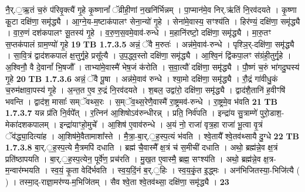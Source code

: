 \documentclass[17pt]{extarticle}
\begin{document}
                  नै॒र्.॒ऋ॒तं च॒रुं प॑रिवृ॒क्त्यै॑ गृ॒हे कृ॒ष्णानां᳚ ॅव्रीही॒णां न॒खनि॑र्भिन्नम् । पा॒प्मान॑मे॒व निर्.ऋ॑तिं नि॒रव॑दयते । कृ॒ष्णा कू॒टा दक्षि॑णा॒ समृ॑द्ध्यै । आ॒ग्ने॒य-म॒ष्टाक॑पालꣳ सेना॒न्यो॑ गृ॒हे । सेना॑मे॒वास्य॒ सꣳश्य॑ति । हिर॑ण्यं॒ दक्षि॑णा॒ समृ॑द्ध्यै । वा॒रु॒णं दश॑कपालꣳ सू॒तस्य॑ गृ॒हे । व॒रु॒ण॒स॒वमे॒वाव॑-रुन्धे । म॒हानि॑रष्टो॒ दक्षि॑णा॒ समृ॑द्ध्यै । मा॒रु॒तꣳ स॒प्तक॑पालं ग्राम॒ण्यो॑ गृ॒हे \textbf{ 19} \newline
                  \newline
                                \textbf{ TB 1.7.3.5} \newline
                  अन्नं॒ ॅवै म॒रुतः॑ । अन्न॑मे॒वाव॑-रुन्धे । पृश्ञि॒र्-दक्षि॑णा॒ समृ॑द्ध्यै । सा॒वि॒त्रं द्वाद॑शकपालं क्ष॒त्तुर्गृ॒हे प्रसू᳚त्यै । उ॒प॒द्ध्व॒स्तो दक्षि॑णा॒ समृ॑द्ध्यै । आ॒श्वि॒नं द्वि॑कपा॒लꣳ स॑ग्रंही॒तुर्गृ॒हे । अ॒श्विनौ॒ वै दे॒वानां᳚ भि॒षजौ᳚ । ताभ्या॑मे॒वास्मै॑ भेष॒जं क॑रोति । स॒वा॒त्यौ॑ दक्षि॑णा॒ समृ॑द्ध्यै । पौ॒ष्णं च॒रुं भा॑गदु॒घस्य॑ गृ॒हे \textbf{ 20} \newline
                  \newline
                                \textbf{ TB 1.7.3.6} \newline
                  अन्नं॒ ॅवै पू॒षा । अन्न॑मे॒वाव॑ रुन्धे । श्या॒मो दक्षि॑णा॒ समृ॑द्ध्यै । रौ॒द्रं गा॑वीधु॒कं च॒रुम॑क्षावा॒पस्य॑ गृ॒हे । अ॒न्त॒त ए॒व रु॒द्रं नि॒रव॑दयते । श॒बल॒ उद्वा॑रो॒ दक्षि॑णा॒ समृ॑द्ध्यै । द्वाद॑शै॒तानि॑ ह॒वीꣳषि॑ भवन्ति । द्वाद॑श॒ मासाः᳚ सम्ॅवथ्स॒रः । स॒म्ॅव॒थ्स॒रेणै॒वास्मै॑ रा॒ष्ट्रमव॑-रुन्धे । रा॒ष्ट्रमे॒व भ॑वति \textbf{ 21} \newline
                  \newline
                                \textbf{ TB 1.7.3.7} \newline
                  यन्न प्र॑ति नि॒र्वपे᳚त् । र॒त्निन॑ आ॒शिषोऽव॑रुन्धीरन्न् । प्रति॒ निर्व॑पति । इन्द्रा॑य सु॒त्राम्णे॑ पुरो॒डाश॒-मेका॑दशकपालम् । इन्द्रा॑याꣳहो॒मुचे᳚ । आ॒शिष॑ ए॒वाव॑रुन्धे । अ॒यं नो॒ राजा॑ वृत्र॒हा राजा॑ भू॒त्वा वृ॒त्रं ॅव॑द्ध्या॒दित्या॑ह । आ॒शिष॑मे॒वैतामाशा᳚स्ते । मै॒त्रा॒-बा॒र्.॒ह॒स्प॒त्यं भ॑वति । श्वे॒तायै᳚ श्वे॒तव॑थ्सायै दु॒ग्धे \textbf{ 22} \newline
                  \newline
                                \textbf{ TB 1.7.3.8} \newline
                  बा॒र्.॒ह॒स्प॒त्ये मै॒त्रमपि॑ दधाति । ब्रह्म॑ चै॒वास्मै᳚ क्ष॒त्रं च॑ स॒मीची॑ दधाति । अथो॒ ब्रह्म॑न्ने॒व क्ष॒त्रं प्रति॑ष्ठापयति । बा॒र्.॒ह॒स्प॒त्येन॒ पूर्वे॑ण॒ प्रच॑रति । मु॒ख॒त ए॒वास्मै॒ ब्रह्म॒ सꣳश्य॑ति । अथो॒ ब्रह्म॑न्ने॒व क्ष॒त्र-म॒न्वार॑म्भयति । स्व॒यं॒ कृ॒ता वेदि॑र्भवति । स्व॒य॒दिं॒नं ब॒र्.॒हिः । स्व॒य॒कृं॒त इ॒द्ध्मः । अन॑भिजितस्या॒-भिजि॑त्यै ( ) । तस्मा॒द्-राज्ञा॒मर॑ण्य-म॒भिजि॑तम् । सैव श्वे॒ता श्वे॒तव॑थ्सा॒ दक्षि॑णा॒ समृ॑द्ध्यै । \textbf{ 23} \newline
\end{document}
